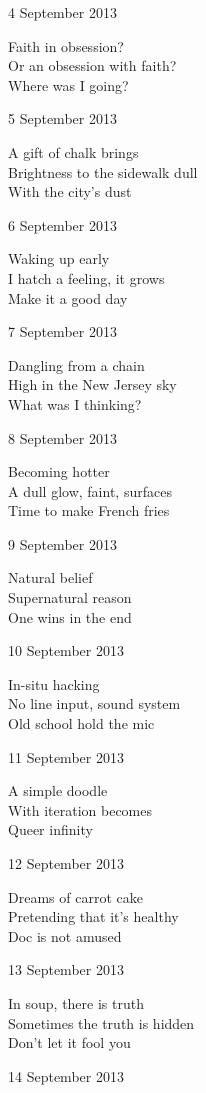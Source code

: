 \documentclass[12pt]{article}
\begin{document}
4 September 2013

Faith in obsession? \\
Or an obsession with faith? \\
Where was I going?

5 September 2013

A gift of chalk brings \\
Brightness to the sidewalk dull \\
With the city's dust

6 September 2013

Waking up early \\
I hatch a feeling, it grows \\
Make it a good day

7 September 2013

Dangling from a chain \\
High in the New Jersey sky \\
What was I thinking?

8 September 2013

Becoming hotter \\
A dull glow, faint, surfaces \\
Time to make French fries

9 September 2013

Natural belief \\
Supernatural reason \\
One wins in the end

\newpage

10 September 2013

In-situ hacking \\
No line input, sound system \\
Old school hold the mic

11 September 2013

A simple doodle \\
With iteration becomes \\
Queer infinity

12 September 2013

Dreams of carrot cake \\
Pretending that it's healthy \\
Doc is not amused

13 September 2013

In soup, there is truth \\
Sometimes the truth is hidden \\
Don't let it fool you

14 September 2013
\end{document}
